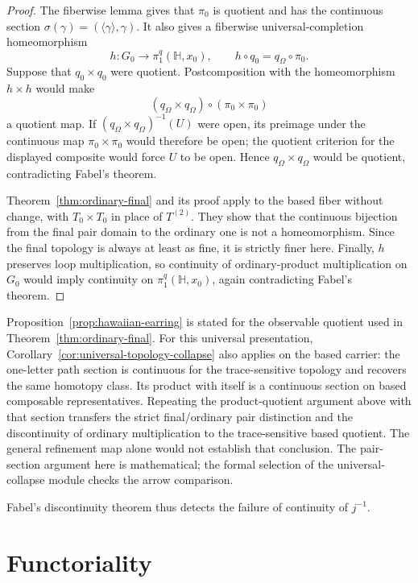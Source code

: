 \documentclass[10pt,reqno]{amsart}
\theoremstyle{definition}
\theoremstyle{plain}
\theoremstyle{remark}
\begin{document}
\begin{proof}
The fiberwise lemma gives that $\pi_0$ is quotient and has the continuous
section $\sigma(\gamma)=(\langle\gamma\rangle,\gamma)$.  It also gives a
fiberwise universal-completion homeomorphism
\[
  h:G_0\longrightarrow\pi_1^q(\mathbb H,x_0),
  \qquad h\circ q_0=q_\Omega\circ\pi_0.
\]
Suppose that $q_0\times q_0$ were
quotient.  Postcomposition with the homeomorphism $h\times h$ would make
\[
  (q_\Omega\times q_\Omega)\circ(\pi_0\times\pi_0)
\]
a quotient map.  If $(q_\Omega\times q_\Omega)^{-1}(U)$ were open, its
preimage under the continuous map $\pi_0\times\pi_0$ would therefore be open;
the quotient criterion for the displayed composite would force $U$ to be
open.  Hence $q_\Omega\times q_\Omega$ would be quotient, contradicting
Fabel's theorem.

Theorem~\ref{thm:ordinary-final} and its proof apply to the based fiber
without change, with $T_0\times T_0$ in place of $T^{(2)}$.  They show that the
continuous bijection from the final pair domain to the ordinary one is not a
homeomorphism.  Since the final topology is always at least as fine, it is
strictly finer here.  Finally, $h$ preserves loop multiplication, so
continuity of ordinary-product multiplication on $G_0$ would imply continuity
on $\pi_1^q(\mathbb H,x_0)$, again contradicting Fabel's theorem.
\end{proof}

Proposition~\ref{prop:hawaiian-earring} is stated for the observable quotient
used in Theorem~\ref{thm:ordinary-final}. For this universal presentation,
Corollary~\ref{cor:universal-topology-collapse} also applies on the based
carrier: the one-letter path section is continuous for the trace-sensitive
topology and recovers the same homotopy class. Its product with itself is a
continuous section on based composable representatives. Repeating the
product-quotient argument above with that section transfers the strict
final/ordinary pair distinction and the discontinuity of ordinary
multiplication to the trace-sensitive based quotient. The general refinement
map alone would not establish that conclusion. The pair-section argument
here is mathematical; the formal selection of the universal-collapse module
checks the arrow comparison.

Fabel's discontinuity theorem thus detects the failure of continuity of
$j^{-1}$.

\section{Functoriality}
\label{sec:functoriality}
\end{document}
